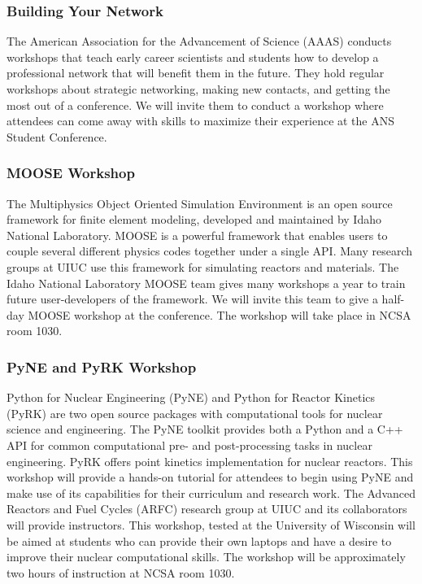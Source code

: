 \subsubsection{Building Your Network}
The American Association for the Advancement of Science (AAAS) conducts workshops that teach early career scientists and students how to develop a professional network that will benefit them in the future. They hold regular workshops about strategic networking, making new contacts, and getting the most out of a conference. We will invite them to conduct a workshop where attendees can come away with skills to maximize their experience at the ANS Student Conference.

\subsubsection{MOOSE Workshop}
The Multiphysics Object Oriented Simulation Environment is an open source framework for finite element modeling, developed and maintained by Idaho National Laboratory. MOOSE is a powerful framework that enables users to couple several different physics codes together under a single API. Many research groups at UIUC use this framework for simulating reactors and materials. The Idaho National Laboratory MOOSE team gives many workshops a year to train future user-developers of the framework. We will invite this team to give a half-day MOOSE workshop at the conference. The workshop will take place in NCSA room 1030.

\subsubsection{PyNE and PyRK Workshop}
Python for Nuclear Engineering (PyNE) and Python for Reactor Kinetics (PyRK) are two open source packages with computational tools for nuclear science and engineering. The PyNE toolkit provides both a Python and a C++ API for common computational pre- and post-processing tasks in nuclear engineering. PyRK offers point kinetics implementation for nuclear reactors. This workshop will provide a hands-on tutorial for attendees to begin using PyNE and make use of its capabilities for their curriculum and research work. The Advanced Reactors and Fuel Cycles (ARFC) research group at UIUC and its collaborators will provide instructors. This workshop, tested at the University of Wisconsin will be aimed at students who can provide their own laptops and have a desire to improve their nuclear computational skills. The workshop will be approximately two hours of instruction at NCSA room 1030.


